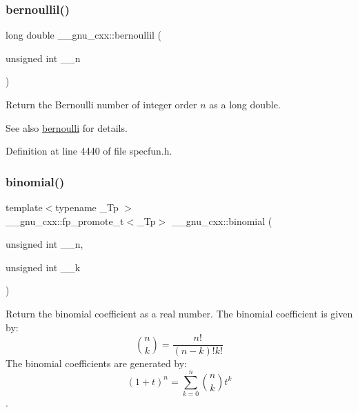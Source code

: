 \subsubsection{\texorpdfstring{bernoullil()}{bernoullil()}}
{\footnotesize\ttfamily long double \+\_\+\+\_\+gnu\+\_\+cxx\+::bernoullil (\begin{DoxyParamCaption}\item[{unsigned int}]{\+\_\+\+\_\+n }\end{DoxyParamCaption})\hspace{0.3cm}{\ttfamily [inline]}}

Return the Bernoulli number of integer order $ n $ as a {\ttfamily long double}.

\begin{DoxySeeAlso}{See also}
\hyperlink{group__gnu__math__spec__func_gad339f0011df1967ec6c9e55bd1547bf4}{bernoulli} for details. 
\end{DoxySeeAlso}


Definition at line 4440 of file specfun.\+h.

\mbox{\label{group__gnu__math__spec__func_gabd0cf6e3f1e1d36c4c45f118e34a5ca2}} 
\subsubsection{\texorpdfstring{binomial()}{binomial()}}
{\footnotesize\ttfamily template$<$typename \+\_\+\+Tp $>$ \\
\+\_\+\+\_\+gnu\+\_\+cxx\+::fp\+\_\+promote\+\_\+t$<$\+\_\+\+Tp$>$ \+\_\+\+\_\+gnu\+\_\+cxx\+::binomial (\begin{DoxyParamCaption}\item[{unsigned int}]{\+\_\+\+\_\+n,  }\item[{unsigned int}]{\+\_\+\+\_\+k }\end{DoxyParamCaption})\hspace{0.3cm}{\ttfamily [inline]}}



Return the binomial coefficient as a real number. The binomial coefficient is given by\+: \[ \binom{n}{k} = \frac{n!}{(n-k)! k!} \] The binomial coefficients are generated by\+: \[ \left(1 + t\right)^n = \sum_{k=0}^n \binom{n}{k} t^k \]. 


